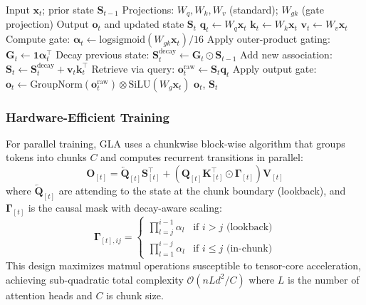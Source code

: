 \documentclass[11pt,a4paper]{article}
\begin{document}
\begin{algorithm}[H]
\caption{Gated Linear Attention (Recurrent Form)}
\begin{algorithmic}[1]
\Require Input $\mathbf{x}_t$; prior state $\mathbf{S}_{t-1}$
\Require Projections: $W_q, W_k, W_v$ (standard); $W_{gk}$ (gate projection)
\Ensure Output $\mathbf{o}_t$ and updated state $\mathbf{S}_t$
\State $\mathbf{q}_t \gets W_q \mathbf{x}_t$
\State $\mathbf{k}_t \gets W_k \mathbf{x}_t$
\State $\mathbf{v}_t \gets W_v \mathbf{x}_t$
\State Compute gate: $\boldsymbol{\alpha}_t \gets \text{logsigmoid}(W_{gk} \mathbf{x}_t) / 16$ 
\State Apply outer-product gating: $\mathbf{G}_t \gets \mathbf{1} \boldsymbol{\alpha}_t^\top$  
\State Decay previous state: $\mathbf{S}_t^\text{decay} \gets \mathbf{G}_t \odot \mathbf{S}_{t-1}$ 
\State Add new association: $\mathbf{S}_t \gets \mathbf{S}_t^\text{decay} + \mathbf{v}_t \mathbf{k}_t^\top$
\State Retrieve via query: $\mathbf{o}_t^\text{raw} \gets \mathbf{S}_t \mathbf{q}_t$
\State Apply output gate: $\mathbf{o}_t \gets \text{GroupNorm}(\mathbf{o}_t^\text{raw}) \otimes \text{SiLU}(W_g \mathbf{x}_t)$
\Return $\mathbf{o}_t$, $\mathbf{S}_t$
\end{algorithmic}
\end{algorithm}

\subsubsection{Hardware-Efficient Training}

For parallel training, GLA uses a chunkwise block-wise algorithm that groups tokens into chunks $C$ and computes recurrent transitions in parallel:
\[
\mathbf{O}_{[t]} = \overleftarrow{\mathbf{Q}}_{[t]} \mathbf{S}_{[t]}^\top + \left(\mathbf{Q}_{[t]} \mathbf{K}_{[t]}^\top \odot \mathbf{\Gamma}_{[t]}\right) \mathbf{V}_{[t]}
\]
where $\overleftarrow{\mathbf{Q}}_{[t]}$ are attending to the state at the chunk boundary (lookback), and $\mathbf{\Gamma}_{[t]}$ is the causal mask with decay-aware scaling:
\[
\mathbf{\Gamma}_{[t],ij} = \begin{cases} \prod_{l=j}^{i-1} \alpha_l & \text{if } i > j \text{ (lookback)} \\ \prod_{l=1}^{i-j} \alpha_l & \text{if } i \le j \text{ (in-chunk)} \end{cases}
\]
This design maximizes matmul operations susceptible to tensor-core acceleration, achieving sub-quadratic total complexity $\mathcal{O}(nLd^2/C)$ where $L$ is the number of attention heads and $C$ is chunk size.
\end{document}
